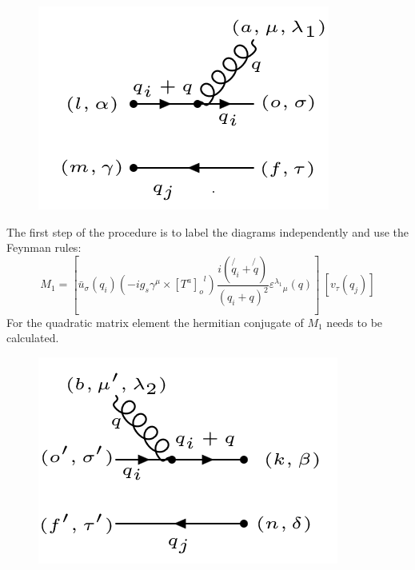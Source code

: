 \begin{figure}[h!]
\centering
\includegraphics[scale=0.7]{images/QQ/qgqbarM.png}
\end{figure}
The first step of the procedure is to label the diagrams independently and use the Feynman rules:
\begin{equation}
M_1 = [{\bar{u}}_{\sigma}(q_i) (-ig_s \gamma^{\mu}\times {[T^a]_o}^l)  \frac{i(\not{q_i} + \not{q})}{(q_i + q)^2} {\varepsilon^{\lambda_1}}_{\mu} (q)]\: [{v}_{\tau}(q_j)]
\end{equation}
For the quadratic matrix element the hermitian conjugate of $ M_1 $ needs to be calculated.
\begin{figure}[h!]
\centering
\includegraphics[scale=0.7]{images/QQ/qgqbarMDega.png}
\end{figure}

